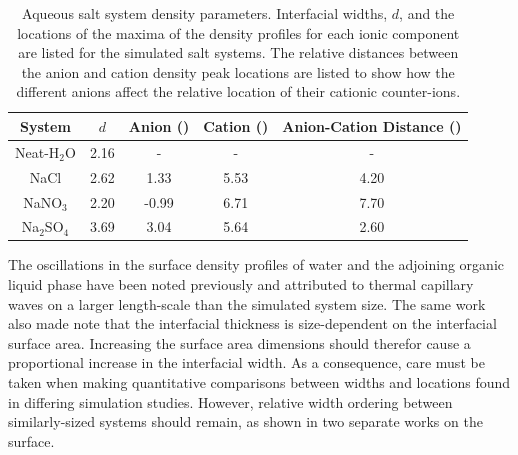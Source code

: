 \begin{table}[htdp]
	\begin{center}
	\begin{tabular}{|c||c|c|c|c|}
		\hline
		System & $d$ & Anion (\angs) & Cation (\angs) & Anion-Cation Distance (\angs) \\ \hline
		Neat-H$_2$O & 2.16 & - & - & - \\ 
		NaCl & 2.62 & 1.33 & 5.53 & 4.20 \\
		NaNO$_3$ & 2.20 & -0.99 & 6.71 & 7.70 \\
		Na$_2$SO$_4$ & 3.69 & 3.04 & 5.64 & 2.60 \\
		\hline
	\end{tabular}
	\end{center}
	\caption{Aqueous salt system density parameters. Interfacial widths, $d$, and the locations of the maxima of the density profiles for each ionic component are listed for the simulated salt systems. The relative distances between the anion and cation density peak locations are listed to show how the different anions affect the relative location of their cationic counter-ions.}
	\label{table:double-layer}
\end{table}

The oscillations in the surface density profiles of water and the adjoining organic \ctc liquid phase have been noted previously and attributed to thermal capillary waves on a larger length-scale than the simulated system size.\cite{Chang1996} The same work also made note that the interfacial thickness is size-dependent on the interfacial surface area. Increasing the surface area dimensions should therefor cause a proportional increase in the interfacial width. As a consequence, care must be taken when making quantitative comparisons between widths and locations found in differing simulation studies. However, relative width ordering between similarly-sized systems should remain, as shown in two separate works on the \ctcwat surface.\cite{Chang1996,Hore2008}


